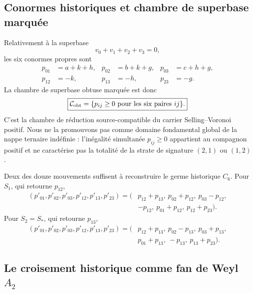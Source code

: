 \documentclass[11pt,a4paper]{article}
\begin{document}
\subsection{Conormes historiques et chambre de superbase marquée}

Relativement à la superbase
\[
 v_0+v_1+v_2+v_3=0,
\]
les six conormes propres sont
\begin{equation}\label{eq:v25-conorms}
 \boxed{
 \begin{aligned}
 p_{01}&=a+k+h,&
 p_{02}&=b+k+g,&
 p_{03}&=c+h+g,\\
 p_{12}&=-k,&
 p_{13}&=-h,&
 p_{23}&=-g.
 \end{aligned}}
\end{equation}
La chambre de superbase obtuse marquée est donc
\begin{equation}\label{eq:v25-obtuse-chamber}
 \boxed{
 \mathcal C_{\rm obt}
 =
 \{p_{ij}\ge0\text{ pour les six paires }ij\}.}
\end{equation}
C'est la chambre de réduction source-compatible du carrier Selling--Voronoi positif. Nous ne la promouvons pas comme domaine fondamental global de la nappe ternaire indéfinie : l'inégalité simultanée $p_{ij}\ge0$ appartient au compagnon positif et ne caractérise pas la totalité de la strate de signature $(2,1)$ ou $(1,2)$.

Deux des douze mouvements suffisent à reconstruire le germe historique $C_6$. Pour $S_1$, qui retourne $p_{12}$,
\begin{equation}\label{eq:v25-S1-conorms}
 \boxed{
 \begin{aligned}
 (p'_{01},p'_{02},p'_{03},p'_{12},p'_{13},p'_{23})
 =(&p_{12}+p_{13},\ p_{02}+p_{12},\ p_{03}-p_{12},\\
 &-p_{12},\ p_{01}+p_{12},\ p_{12}+p_{23}).
 \end{aligned}}
\end{equation}
Pour $S_2=S_*$, qui retourne $p_{13}$,
\begin{equation}\label{eq:v25-S2-conorms}
 \boxed{
 \begin{aligned}
 (p'_{01},p'_{02},p'_{03},p'_{12},p'_{13},p'_{23})
 =(&p_{12}+p_{13},\ p_{02}-p_{13},\ p_{03}+p_{13},\\
 &p_{01}+p_{13},\ -p_{13},\ p_{13}+p_{23}).
 \end{aligned}}
\end{equation}

\subsection{Le croisement historique comme fan de Weyl \texorpdfstring{$A_2$}{A2}}
\end{document}
